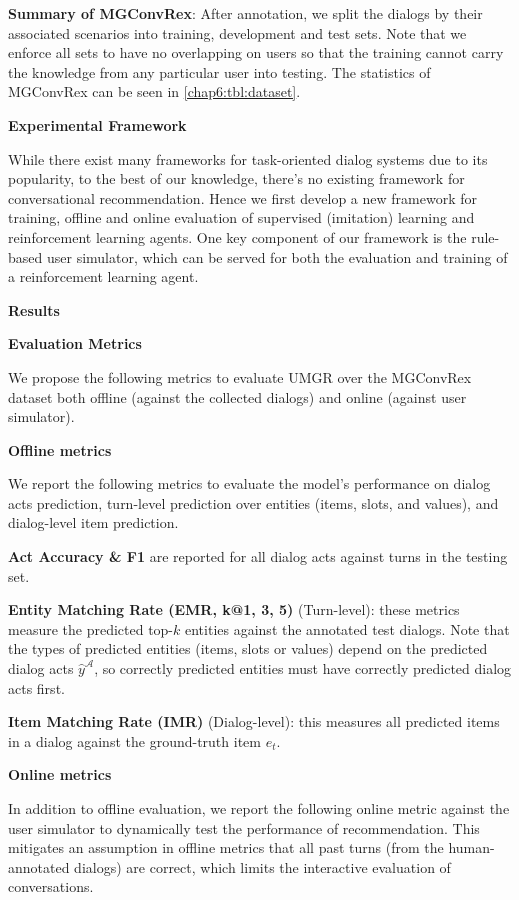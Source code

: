 \noindent \textbf{Summary of \textbf{MGConvRex}}:
\label{sec:dataset_stat}
After annotation, we split the dialogs by their associated scenarios into training, development and test sets.
Note that we enforce all sets to have no overlapping on users so that the training cannot carry the knowledge from any particular user into testing.
The statistics of MGConvRex can be seen in \ref{chap6:tbl:dataset}.

\textbf{Experimental Framework}

While there exist many frameworks for task-oriented dialog systems \cite{li2016user,li2018microsoft,lee2019convlab} due to its popularity,
to the best of our knowledge, there's no existing framework for conversational recommendation.
Hence we first develop a new framework for training, offline and online evaluation of supervised (imitation) learning and reinforcement learning agents.
One key component of our framework is the rule-based user simulator, which can be served for both the evaluation and training of a reinforcement learning agent.

\textbf{Results}
\label{chap6:sec:exp}

\textbf{Evaluation Metrics}

We propose the following metrics to evaluate UMGR over the MGConvRex dataset both offline (against the collected dialogs) and online (against user simulator).

\textbf{Offline metrics}

We report the following metrics to evaluate the model's performance on dialog acts prediction, turn-level prediction over entities (items, slots, and values), and dialog-level item prediction.

\noindent \textbf{Act Accuracy \& F1} are reported for all dialog acts against turns in the testing set.

\noindent \textbf{Entity Matching Rate (EMR, k@1, 3, 5)} (Turn-level): these metrics measure the predicted top-$k$ entities against the annotated test dialogs. 
Note that the types of predicted entities (items, slots or values) depend on the predicted dialog acts $\hat{y}^\mathcal{A}$, so correctly predicted entities must have correctly predicted dialog acts first.

\noindent \textbf{Item Matching Rate (IMR)} (Dialog-level): this measures all predicted items in a dialog against the ground-truth item $e_t$.

\textbf{Online metrics}

In addition to offline evaluation, we report the following online metric against the user simulator to dynamically test the performance of recommendation. This mitigates an assumption in offline metrics that all past turns (from the human-annotated dialogs) are correct, which limits the interactive evaluation of conversations.

